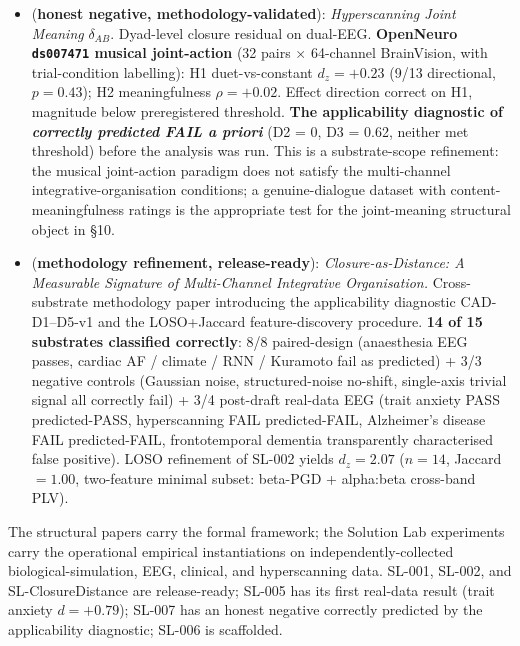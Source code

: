 \documentclass[11pt]{article}
\theoremstyle{plain}
\theoremstyle{definition}
\theoremstyle{remark}
\begin{document}
\begin{itemize}[leftmargin=2em]
\item \citet{SolutionLab007} (\textbf{honest negative, methodology-validated}): \emph{Hyperscanning Joint Meaning} $\delta_{AB}$. Dyad-level closure residual on dual-EEG. \textbf{OpenNeuro \texttt{ds007471} musical joint-action} (32 pairs × 64-channel BrainVision, with trial-condition labelling): H1 duet-vs-constant $d_z = +0.23$ (9/13 directional, $p = 0.43$); H2 meaningfulness $\rho = +0.02$. Effect direction correct on H1, magnitude below preregistered threshold. \textbf{The applicability diagnostic of \citet{SmartClosureDistance} \emph{correctly predicted FAIL a priori}} (D2 = 0, D3 = 0.62, neither met threshold) before the analysis was run. This is a substrate-scope refinement: the musical joint-action paradigm does not satisfy the multi-channel integrative-organisation conditions; a genuine-dialogue dataset with content-meaningfulness ratings is the appropriate test for the joint-meaning structural object in \citet{SmartLifeAsClosure} \S 10.
\item \citet{SmartClosureDistance} (\textbf{methodology refinement, release-ready}): \emph{Closure-as-Distance: A Measurable Signature of Multi-Channel Integrative Organisation.} Cross-substrate methodology paper introducing the applicability diagnostic CAD-D1--D5-v1 and the LOSO+Jaccard feature-discovery procedure. \textbf{14 of 15 substrates classified correctly}: 8/8 paired-design (anaesthesia EEG passes, cardiac AF / climate / RNN / Kuramoto fail as predicted) + 3/3 negative controls (Gaussian noise, structured-noise no-shift, single-axis trivial signal all correctly fail) + 3/4 post-draft real-data EEG (trait anxiety PASS predicted-PASS, hyperscanning FAIL predicted-FAIL, Alzheimer's disease FAIL predicted-FAIL, frontotemporal dementia transparently characterised false positive). LOSO refinement of SL-002 yields $d_z = 2.07$ ($n = 14$, Jaccard $= 1.00$, two-feature minimal subset: beta-PGD + alpha:beta cross-band PLV).
\end{itemize}

The structural papers carry the formal framework; the Solution Lab experiments carry the operational empirical instantiations on independently-collected biological-simulation, EEG, clinical, and hyperscanning data. SL-001, SL-002, and SL-ClosureDistance are release-ready; SL-005 has its first real-data result (trait anxiety $d = +0.79$); SL-007 has an honest negative correctly predicted by the applicability diagnostic; SL-006 is scaffolded.
\end{document}
